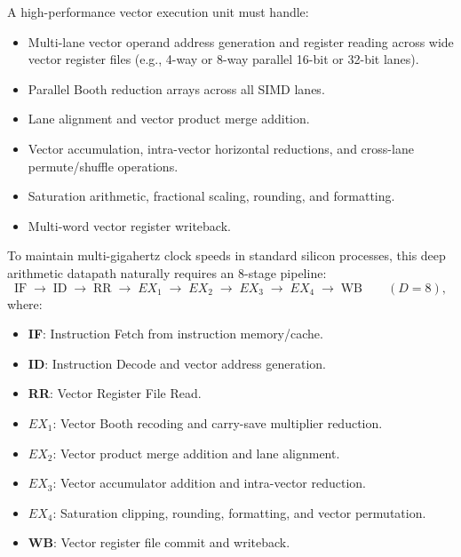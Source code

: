 A high-performance vector execution unit must handle:
\begin{itemize}
    \item Multi-lane vector operand address generation and register reading across wide vector register files (e.g., 4-way or 8-way parallel 16-bit or 32-bit lanes).
    \item Parallel Booth reduction arrays across all SIMD lanes.
    \item Lane alignment and vector product merge addition.
    \item Vector accumulation, intra-vector horizontal reductions, and cross-lane permute/shuffle operations.
    \item Saturation arithmetic, fractional scaling, rounding, and formatting.
    \item Multi-word vector register writeback.
\end{itemize}
To maintain multi-gigahertz clock speeds in standard silicon processes, this deep arithmetic datapath naturally requires an 8-stage pipeline:
\begin{equation}
\text{IF} \;\longrightarrow\; \text{ID} \;\longrightarrow\; \text{RR} \;\longrightarrow\; EX_1 \;\longrightarrow\; EX_2 \;\longrightarrow\; EX_3 \;\longrightarrow\; EX_4 \;\longrightarrow\; \text{WB} \qquad (D = 8),
\end{equation}
where:
\begin{itemize}
    \item \textbf{IF}: Instruction Fetch from instruction memory/cache.
    \item \textbf{ID}: Instruction Decode and vector address generation.
    \item \textbf{RR}: Vector Register File Read.
    \item \textbf{$EX_1$}: Vector Booth recoding and carry-save multiplier reduction.
    \item \textbf{$EX_2$}: Vector product merge addition and lane alignment.
    \item \textbf{$EX_3$}: Vector accumulator addition and intra-vector reduction.
    \item \textbf{$EX_4$}: Saturation clipping, rounding, formatting, and vector permutation.
    \item \textbf{WB}: Vector register file commit and writeback.
\end{itemize}

